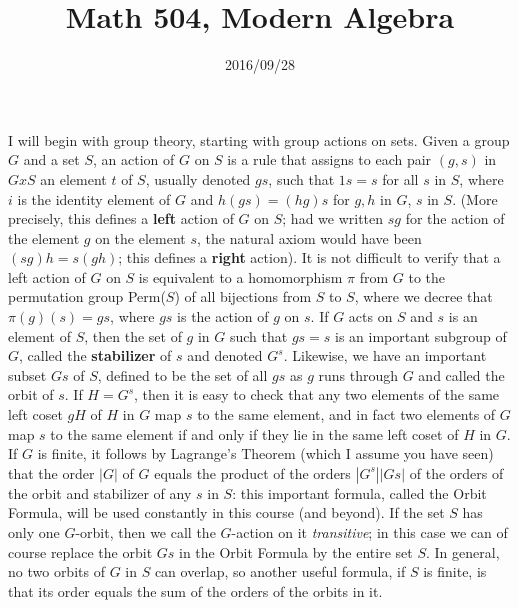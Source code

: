 \documentclass[10pt]{article}
\title{Math 504, Modern Algebra}
\date{2016/09/28}
\begin{document}
\maketitle

I will begin with group theory, starting with group actions on sets.
Given a group $G$ and a set $S$, an action of $G$ on $S$ is a rule that
assigns to each pair $(g,s)$ in $G x S$ an element $t$ of $S$, usually
denoted $gs$, such that $1s = s$ for all $s$ in $S$, where $i$ is the
identity element of $G$ and $h(gs) = (hg)s$ for $g,h$ in $G$, $s$ in
$S$. (More precisely, this defines a \textbf{left} action of $G$ on $S$;
had we written $sg$ for the action of the element $g$ on the element
$s$, the natural axiom would have been $(sg)h = s(gh)$; this defines a
\textbf{right} action). It is not difficult to verify that a left action
of $G$ on $S$ is equivalent to a homomorphism $\pi$ from $G$ to the
permutation group Perm($S$) of all bijections from $S$ to $S$, where we
decree that $\pi(g)(s) = gs$, where $gs$ is the action of $g$ on $s$. If
$G$ acts on $S$ and $s$ is an element of $S$, then the set of $g$ in $G$
such that $gs = s$ is an important subgroup of $G$, called the
\textbf{stabilizer} of $s$ and denoted $G^s$. Likewise, we have an
important subset $Gs$ of $S$, defined to be the set of all $gs$ as $g$
runs through $G$ and called the orbit of $s$. If $H = G^s$, then it is
easy to check that any two elements of the same left coset $gH$ of $H$
in $G$ map $s$ to the same element, and in fact two elements of $G$ map
$s$ to the same element if and only if they lie in the same left coset
of $H$ in $G$. If $G$ is finite, it follows by Lagrange's Theorem (which
I assume you have seen) that the order $|G|$ of $G$ equals the product
of the orders $|G^s||Gs|$ of the orders of the orbit and stabilizer of
any $s$ in $S$: this important formula, called the Orbit Formula, will
be used constantly in this course (and beyond). If the set $S$ has only
one $G$-orbit, then we call the $G$-action on it {\sl transitive}; in
this case we can of course replace the orbit $Gs$ in the Orbit Formula
by the entire set $S$. In general, no two orbits of $G$ in $S$ can
overlap, so another useful formula, if $S$ is finite, is that its order
equals the sum of the orders of the orbits in it.
\end{document}
